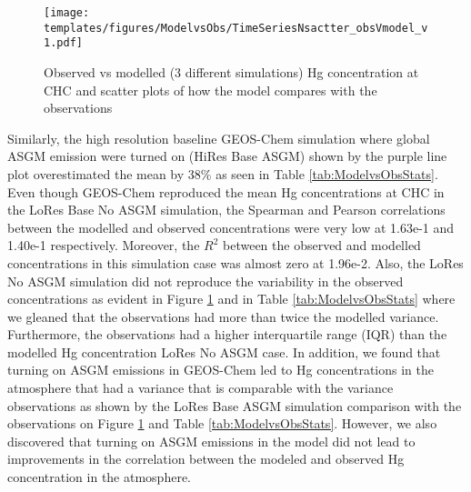 \begin{figure}[H]
  \texttt{[image: templates/figures/ModelvsObs/TimeSeriesNsactter\_obsVmodel\_v1.pdf]}
  \centering
  \caption{Observed vs modelled (3 different simulations) Hg concentration at CHC and scatter plots of how the model compares with the observations  }
  \label{fig:ModelvsObsNstats}
\end{figure}
\FloatBarrier
\begin{flushleft}
 Similarly, the high resolution baseline GEOS-Chem simulation where global ASGM emission were turned on (HiRes Base ASGM) shown by the purple line plot overestimated the mean by 38\% as seen in Table \ref{tab:ModelvsObsStats}. Even though GEOS-Chem reproduced the mean Hg concentrations at CHC in the LoRes Base No ASGM simulation, the Spearman and Pearson correlations between the modelled and observed concentrations were very low at  1.63e-1 and 1.40e-1 respectively. Moreover, the $R^2$ between the observed and modelled concentrations in this simulation case was almost zero at 1.96e-2. Also, the LoRes No ASGM simulation did not reproduce the variability in the observed concentrations as evident in Figure \ref{fig:ModelvsObsNstats} and in Table \ref{tab:ModelvsObsStats} where we gleaned that the observations had more than twice the modelled variance. Furthermore, the observations had a higher interquartile range (IQR) than the modelled Hg concentration LoRes No ASGM case. In addition, we found that turning on ASGM emissions in GEOS-Chem led to Hg concentrations in the atmosphere that had a variance that is comparable with the variance observations as shown by the LoRes Base ASGM simulation comparison with the observations on Figure \ref{fig:ModelvsObsNstats} and Table \ref{tab:ModelvsObsStats}. However, we also discovered that turning on ASGM emissions in the model did not lead to improvements in the correlation between the modeled and observed Hg concentration in the atmosphere. 
\end{flushleft}
\setlength{\tabcolsep}{2.5pt}
